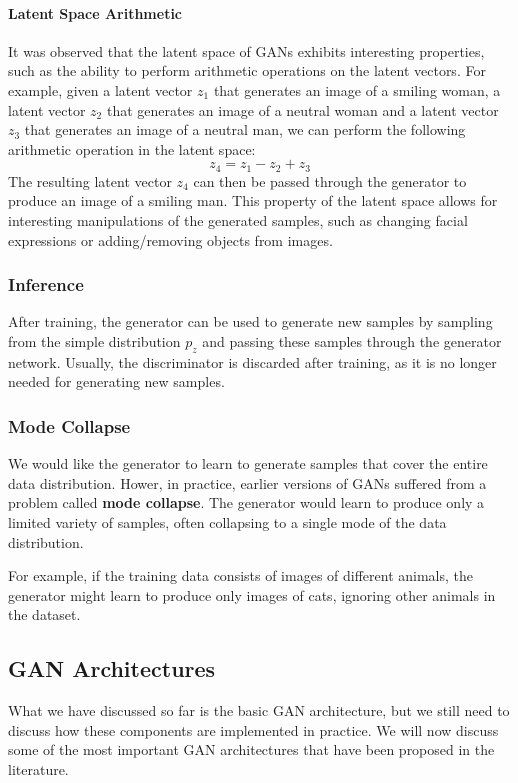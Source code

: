 \paragraph{Latent Space Arithmetic}
It was observed that the latent space of GANs exhibits interesting properties, such as the ability to perform arithmetic operations on the latent vectors.
For example, given a latent vector $z_1$ that generates an image of a smiling woman, a latent vector $z_2$ that generates an image of a neutral woman and a latent vector $z_3$ that generates an image of a neutral man, we can perform the following arithmetic operation in the latent space:
\begin{equation}
    z_4 = z_1 - z_2 + z_3
\end{equation}
The resulting latent vector $z_4$ can then be passed through the generator to produce an image of a smiling man. 
This property of the latent space allows for interesting manipulations of the generated samples, such as changing facial expressions or adding/removing objects from images.

\subsubsection{Inference}
After training, the generator can be used to generate new samples by sampling from the simple distribution $p_{z}$ and passing these samples through the generator network.
Usually, the discriminator is discarded after training, as it is no longer needed for generating new samples.

\subsubsection{Mode Collapse}
We would like the generator to learn to generate samples that cover the entire data distribution. Hower, in practice, earlier versions of GANs
suffered from a problem called \textbf{mode collapse}. The generator would learn to produce only a limited variety of samples, often collapsing to a single mode of the data distribution.

For example, if the training data consists of images of different animals, the generator might learn to produce only images of cats, ignoring other animals in the dataset.

\subsection{GAN Architectures}
What we have discussed so far is the basic GAN architecture, but we still need to discuss how these components are implemented in practice.
We will now discuss some of the most important GAN architectures that have been proposed in the literature.

